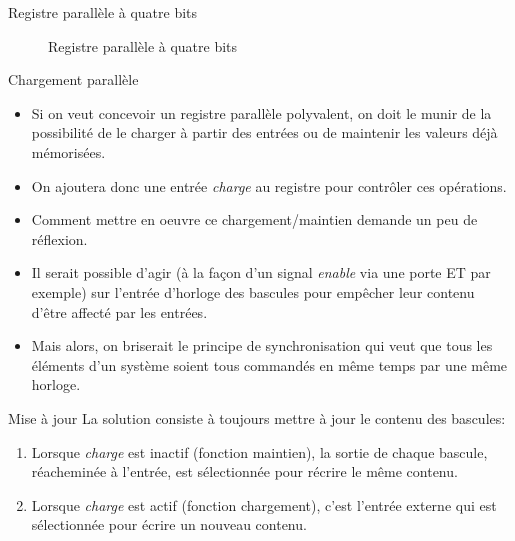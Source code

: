 \documentclass[presentation]{beamer}
\begin{document}
\begin{frame}[label={sec:org5a231a9}]{Registre parallèle à quatre bits}
\begin{figure}[htbp]
\centering

\caption{\label{fig:orga54598b}Registre parallèle à quatre bits}
\end{figure}
\end{frame}

\begin{frame}[label={sec:orgfdac80e}]{Chargement parallèle}
\begin{itemize}
\item Si on veut concevoir un registre parallèle polyvalent, on doit le munir de la possibilité de le charger à partir des entrées ou de maintenir les valeurs déjà mémorisées.

\item On ajoutera donc une entrée \emph{charge} au registre pour contrôler ces opérations.

\item Comment mettre en oeuvre ce chargement/maintien demande un peu de réflexion.

\item Il serait possible d'agir (à la façon d'un signal \emph{enable} via une porte ET par exemple) sur l'entrée d'horloge des bascules pour empêcher leur contenu d'être affecté par les entrées.

\item Mais alors, on briserait le principe de synchronisation qui veut que tous les éléments d'un système soient tous commandés en même temps par une même horloge.
\end{itemize}
\end{frame}

\begin{frame}[label={sec:orgab7ab71}]{Mise à jour}
La solution consiste à toujours mettre à jour le contenu des bascules: 

\begin{enumerate}
\item Lorsque \emph{charge} est inactif (fonction maintien), la sortie de chaque bascule, réacheminée à l'entrée, est sélectionnée pour récrire le même contenu.
\item Lorsque \emph{charge} est actif (fonction chargement), c'est l'entrée externe qui est sélectionnée pour écrire un nouveau contenu.
\end{enumerate}
\end{frame}
\end{document}
